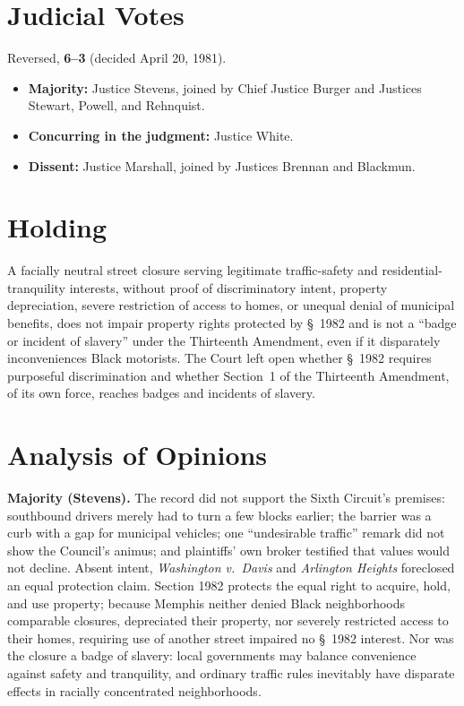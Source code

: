 \documentclass[12pt]{article}
\begin{document}
\section{Judicial Votes}

Reversed, \textbf{6--3} (decided April 20, 1981).
\begin{itemize}
\item \textbf{Majority:} Justice Stevens, joined by Chief Justice Burger and Justices Stewart, Powell, and Rehnquist.
\item \textbf{Concurring in the judgment:} Justice White.
\item \textbf{Dissent:} Justice Marshall, joined by Justices Brennan and Blackmun.
\end{itemize}

\section{Holding}

A facially neutral street closure serving legitimate traffic-safety and residential-tranquility interests, without proof of discriminatory intent, property depreciation, severe restriction of access to homes, or unequal denial of municipal benefits, does not impair property rights protected by \S~1982 and is not a ``badge or incident of slavery'' under the Thirteenth Amendment, even if it disparately inconveniences Black motorists. The Court left open whether \S~1982 requires purposeful discrimination and whether Section~1 of the Thirteenth Amendment, of its own force, reaches badges and incidents of slavery.

\section{Analysis of Opinions}

\textbf{Majority (Stevens).} The record did not support the Sixth Circuit's premises: southbound drivers merely had to turn a few blocks earlier; the barrier was a curb with a gap for municipal vehicles; one ``undesirable traffic'' remark did not show the Council's animus; and plaintiffs' own broker testified that values would not decline. Absent intent, \textit{Washington v.\ Davis} and \textit{Arlington Heights} foreclosed an equal protection claim. Section 1982 protects the equal right to acquire, hold, and use property; because Memphis neither denied Black neighborhoods comparable closures, depreciated their property, nor severely restricted access to their homes, requiring use of another street impaired no \S~1982 interest. Nor was the closure a badge of slavery: local governments may balance convenience against safety and tranquility, and ordinary traffic rules inevitably have disparate effects in racially concentrated neighborhoods.
\end{document}
